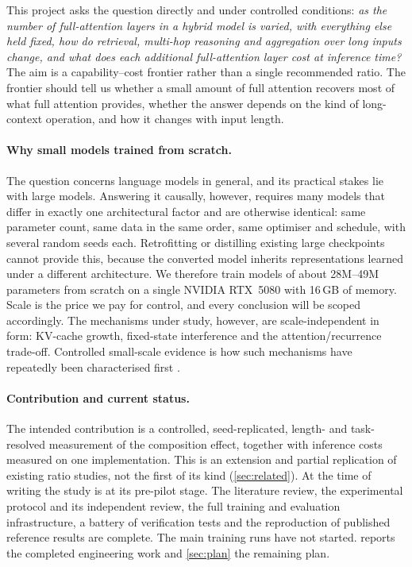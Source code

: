 \documentclass[10pt,a4paper]{article}
\begin{document}
This project asks the question directly and under controlled conditions:
\emph{as the number of full-attention layers in a hybrid model is varied, with everything else held
fixed, how do retrieval, multi-hop reasoning and aggregation over long inputs change, and what does
each additional full-attention layer cost at inference time?} The aim is a capability--cost
frontier rather than a single recommended ratio. The frontier should tell us whether a small amount
of full attention recovers most of what full attention provides, whether the answer depends on the
kind of long-context operation, and how it changes with input length.

\paragraph{Why small models trained from scratch.}
The question concerns language models in general, and its practical stakes lie with large models.
Answering it causally, however, requires many models that differ in exactly one architectural
factor and are otherwise identical: same parameter count, same data in the same order, same
optimiser and schedule, with several random seeds each. Retrofitting or distilling existing large
checkpoints cannot provide this, because the converted model inherits representations learned under
a different architecture. We therefore train models of about 28M--49M parameters from scratch on a
single NVIDIA RTX~5080 with 16\,GB of memory. Scale is the price we pay for control, and every
conclusion will be scoped accordingly. The mechanisms under study, however, are scale-independent in
form: KV-cache growth, fixed-state interference and the attention/recurrence trade-off. Controlled
small-scale evidence is how such mechanisms have repeatedly been characterised first
\citep{arora2023zoology,waleffe2024empirical,wang2025systematic}.

\paragraph{Contribution and current status.}
The intended contribution is a controlled, seed-replicated, length- and task-resolved measurement of
the composition effect, together with inference costs measured on one implementation. This is an
extension and partial replication of existing ratio studies, not the first of its kind
(\cref{sec:related}). At the time of writing the study is at its pre-pilot stage. The literature
review, the experimental protocol and its independent review, the full training and evaluation
infrastructure, a battery of verification tests and the reproduction of published reference results
are complete. The main training runs have not started.  reports the completed
engineering work and \cref{sec:plan} the remaining plan.\enlargethispage{2\baselineskip}
\end{document}
